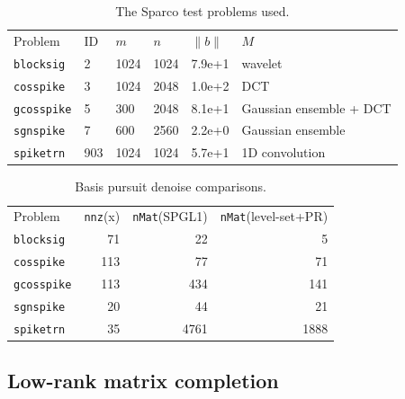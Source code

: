 \begin{table}[t]
    \centering
    \begin{tabular}{llllll}
        \toprule
        Problem             &   ID &    $m$ &   $n$ &   $\|b\|$ &   $M$\\
        \texttt{blocksig}   &   2  &    1024&   1024&   7.9e+1  &   wavelet\\
        \texttt{cosspike}   &   3  &    1024&   2048&   1.0e+2  &   DCT\\
        \texttt{gcosspike}  &   5  &    300 &   2048&   8.1e+1  &   Gaussian ensemble + DCT\\
        \texttt{sgnspike}   &   7  &    600 &   2560&   2.2e+0  &   Gaussian ensemble\\
        \texttt{spiketrn}   &   903&    1024&   1024&   5.7e+1  &   1D convolution\\
        \bottomrule
    \end{tabular}
    \captionsetup{justification=centering}
    \caption{The Sparco test problems used.}
    \label{tab:sparco_info}
\end{table}

\begin{table}[t]
    \centering
    \begin{tabular}{lrrr}
        \toprule
        Problem             &   \texttt{nnz}(x) &    \texttt{nMat}(SPGL1) & \texttt{nMat}(level-set+PR)\\
        \texttt{blocksig}   &   71              &     22                  &   5\\
        \texttt{cosspike}   &   113             &     77                  &   71\\
        \texttt{gcosspike}  &   113             &    434                  &   141\\
        \texttt{sgnspike}   &   20              &    44                   &   21\\
        \texttt{spiketrn}   &   35              &    4761                 &   1888\\
        \bottomrule
    \end{tabular}
    \captionsetup{justification=centering}
    \caption{Basis pursuit denoise comparisons.}
    \label{tab:bpdn}
\end{table}

\subsection{Low-rank matrix completion} \label{sec:lrmc}

